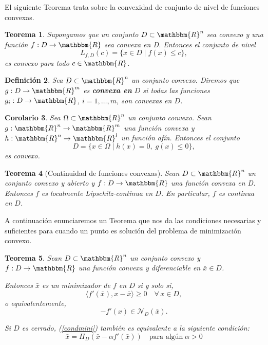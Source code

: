 \documentclass[a4paper,12pt]{report}
\newcommand{\la}{\langle}
\newcommand{\ra}{\rangle}
\newcommand{\RR}{\mathbbm{R}}
\newcommand{\Rn}{\RR^n}
\newcommand{\Rm}{\RR^m}
\newcommand{\bx}{\bar{x}}
\newcommand{\arr}{\rightarrow}
\newtheorem{teo}{Teorema}[section]
\newtheorem{cor}[teo]{Corolario}
\newtheorem{defi}[teo]{Definici\'on}
\begin{document}
El siguiente Teorema trata sobre la convexidad de conjunto de nivel de funciones convexas. 
\begin{teo}
Supongamos que un conjunto $D\subset\Rn$ sea convexo y una funci\'on $f:D\arr\RR$ sea convexa en D.
Entonces el conjunto de nivel
$$L_{f,D}(c)=\{x\in D\mid f(x)\leq c\},$$
es convexo para todo $c\in\RR$.
\end{teo}

\begin{defi}
Sea $D\subset\Rn$ un conjunto convexo. Diremos que $g:D\arr\Rm$ es \textbf{convexa en} $\bm{\mathit{D}}$ si todas las funciones $g_i:D\arr\RR$, $i=1,\ldots,m$, son convexas en $D$. 
\end{defi}

\begin{cor}
Sea $\Omega\subset\Rn$ un conjunto convexo. Sean $g:\Rn\arr\Rm$ una funci\'on convexa y $h:\Rn\arr\RR^l$ un funci\'on af\'in. Entonces el conjunto
$$D=\{x\in\Omega\mid h(x)=0,\;g(x)\leq 0\},$$
es convexo.
\end{cor}

\begin{teo}[Continuidad de funciones convexas] 
Sean $D\subset\Rn$ un conjunto convexo y abierto y $f:D\arr\RR$ una funci\'on convexa en D.
Entonces $f$ es localmente Lipschitz-continua en $D$. En particular, $f$ es continua en $D$.
\end{teo}

A continuaci\'on enunciaremos un Teorema que nos da las condiciones necesarias y suficientes para cuando un punto es soluci\'on del problema de minimizaci\'on convexo.
\begin{teo}
Sean $D\subset\Rn$ un conjunto convexo y $f:D\arr\RR$ una funci\'on convexa y diferenciable en $\bx\in D$.

Entonces $\bx$ es un minimizador de $f$ en $D$ si y solo si,
\begin{equation}\label{condmini}
\la f'(\bx),x-\bx\ra\geq 0\quad \forall\, x\in D,
\end{equation}
o equivalentemente,
\begin{equation}
-f'(x)\in\mathcal{N}_{D}(\bx).
\end{equation}

Si $D$ es cerrado,  (\ref{condmini}) tambi\'en es equivalente a la siguiente condici\'on:
\begin{equation}
\bx=\Pi_{D}(\bx-\alpha f'(\bx))\quad \mbox{para alg\'un}\;\alpha>0
\end{equation}
\end{teo}
\end{document}
